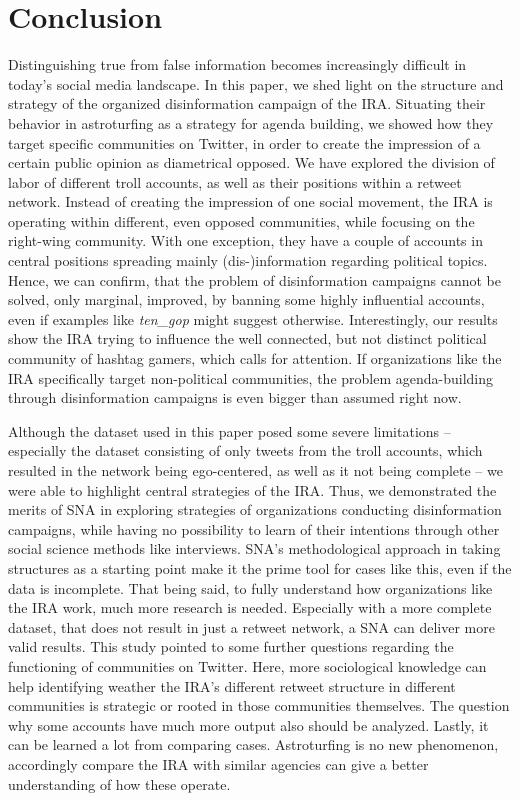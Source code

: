 \documentclass[12pt, titlepage=true, toc=bib]{scrartcl}
\begin{document}
\section{Conclusion}

Distinguishing true from false information becomes increasingly difficult in today's social media landscape. In this paper, we shed light on the structure and strategy of the organized disinformation campaign of the IRA. Situating their behavior in astroturfing as a strategy for agenda building, we showed how they target specific communities on Twitter, in order to create the impression of a certain public opinion as diametrical opposed. We have explored the division of labor of different troll accounts, as well as their positions within a retweet network. Instead of creating the impression of one social movement, the IRA is operating within different, even  opposed communities, while focusing on the right-wing community. With one exception, they have a couple of accounts in central positions spreading mainly (dis-)information regarding political topics. Hence, we can confirm, that the problem of disinformation campaigns cannot be solved, only marginal, improved, by banning some highly influential accounts, even if examples like \textit{ten\_gop} might suggest otherwise. Interestingly, our results show the IRA trying to influence the well connected, but not distinct political community of hashtag gamers, which calls for attention. If organizations like the IRA specifically target non-political communities, the problem agenda-building through disinformation campaigns is even bigger than assumed right now.

Although the dataset used in this paper posed some severe limitations -- especially the dataset consisting of only tweets from the troll accounts, which resulted in the network being ego-centered, as well as it not being complete -- we were able to highlight central strategies of the IRA. Thus, we demonstrated the merits of SNA in exploring strategies of organizations conducting disinformation campaigns, while having no possibility to learn of their intentions through other social science methods like interviews. SNA's methodological approach in taking structures as a starting point make it the prime tool for cases like this, even if the data is incomplete. That being said, to fully understand how organizations like the IRA work, much more research is needed. Especially with a more complete dataset, that does not result in just a retweet network, a SNA can deliver more valid results. This study pointed to some further questions regarding the functioning of communities on Twitter. Here, more sociological knowledge can help identifying weather the IRA's different retweet structure in different communities is strategic or rooted in those communities themselves. The question why some accounts have much more output also should be analyzed. Lastly, it can be learned a lot from comparing cases. Astroturfing is no new phenomenon, accordingly compare the IRA with similar agencies can give a better understanding of how these operate.
\end{document}
